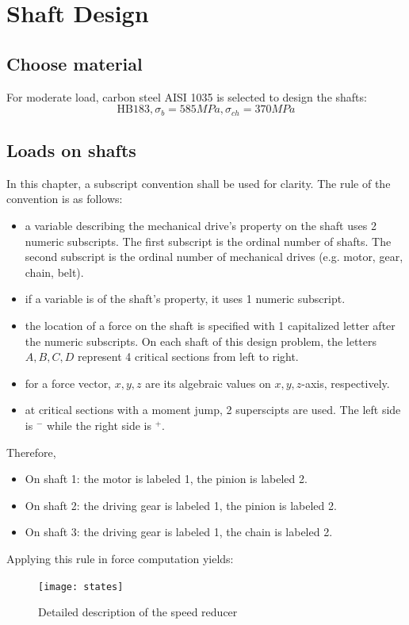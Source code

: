 \chapter{Shaft Design}

\section{Choose material}
For moderate load, carbon steel AISI 1035 \cite{aisi1035} is selected to design the shafts:
\[\text{HB}183, \sigma_b = 585\unit{MPa}, \sigma_{ch} = 370\unit{MPa} \]

\section{Loads on shafts}
In this chapter, a subscript convention shall be used for clarity. The rule of the convention is as follows:
\begin{itemize}
	\item a variable describing the mechanical drive's property on the shaft uses 2 numeric subscripts. The first subscript is the ordinal number of shafts. The second subscript is the ordinal number of mechanical drives (e.g. motor, gear, chain, belt).
	\item if a variable is of the shaft's property, it uses 1 numeric subscript.
	\item the location of a force on the shaft is specified with 1 capitalized letter after the numeric subscripts. On each shaft of this design problem, the letters $ A,B,C,D $ represent 4 critical sections from left to right.
	\item for a force vector, $ x,y,z $ are its algebraic values on $ x,y,z $-axis, respectively.
	\item at critical sections with a moment jump, 2 superscipts are used. The left side is $ ^- $ while the right side is $ ^+ $.
\end{itemize}
Therefore,
\begin{itemize}
	\item On shaft 1: the motor is labeled 1, the pinion is labeled 2.
	\item On shaft 2: the driving gear is labeled 1, the pinion is labeled 2.
	\item On shaft 3: the driving gear is labeled 1, the chain is labeled 2.
\end{itemize}
Applying this rule in force computation yields:\\

\begin{figure}[ht]
	\centering
	\texttt{[image: states]}
	\caption{Detailed description of the speed reducer}
	\label{states}
\end{figure}

